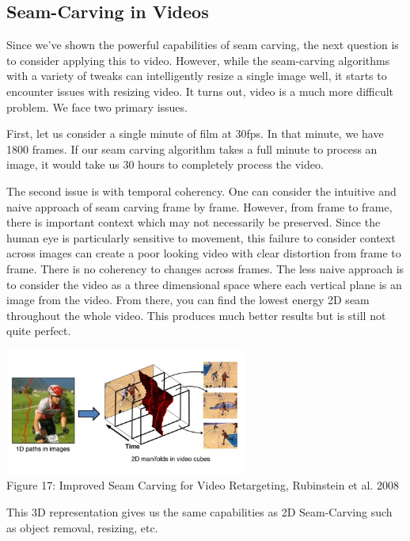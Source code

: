 \documentclass{article}
\begin{document}
\subsection{Seam-Carving in Videos}
Since we've shown the powerful capabilities of seam carving, the next question is to consider applying this to video. However, while the seam-carving algorithms with a variety of tweaks can intelligently resize a single image well, it starts to encounter issues with resizing video. It turns out, video is a much more difficult problem. We face two primary issues.

First, let us consider a single minute of film at 30fps. In that minute, we have 1800 frames. If our seam carving algorithm takes a full minute to process an image, it would take us 30 hours to completely process the video.

The second issue is with temporal coherency. One can consider the intuitive and naive approach of seam carving frame by frame. However, from frame to frame, there is important context which may not necessarily be preserved. Since the human eye is particularly sensitive to movement, this failure to consider context across images can create a poor looking video with clear distortion from frame to frame. There is no coherency to changes across frames. The less naive approach is to consider the video as a three dimensional space where each vertical plane is an image from the video. From there, you can find the lowest energy 2D seam throughout the whole video. This produces much better results but is still not quite perfect.
\begin{center}
\includegraphics[width=8cm]{video_retargeting.JPG} \\
Figure 17: Improved Seam Carving for Video Retargeting, Rubinstein et al. 2008
\end{center}

This 3D representation gives us the same capabilities as 2D Seam-Carving such as object removal, resizing, etc.
\end{document}
